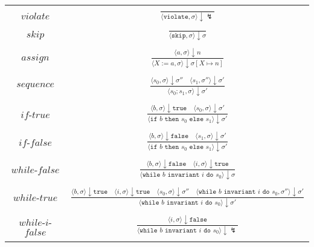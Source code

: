 \begin{tabular}{|c c|}
 \hline
  & \\
 $violate$ & $
		\frac{}{\langle \texttt{violate}, \sigma \rangle \downarrow \lightning}$ \\
  & \\
 $skip$ & $
		\frac{}{\langle \texttt{skip}, \sigma \rangle \downarrow \sigma}$ \\
  & \\
 $assign$ & $\frac{
		\langle a, \sigma \rangle \downarrow n
	}{
		\langle X:= a, \sigma \rangle \downarrow \sigma [X \mapsto n]
	} $\\
  & \\
 $sequence$ & $\frac{
		\langle s_0, \sigma \rangle \downarrow \sigma '' \quad
    \langle s_1, \sigma '' \rangle \downarrow \sigma'
	}{
		\langle s_0;s_1, \sigma \rangle \downarrow \sigma '
	} $\\
  & \\
 $if$-$true$ & $\frac{
		\langle b, \sigma \rangle \downarrow \texttt{true} \quad
    \langle s_0, \sigma \rangle \downarrow \sigma'
	}{
		\langle \texttt{if } b \texttt{ then } s_0 \texttt{ else } s_1 \rangle \downarrow \sigma '
	} $\\
  & \\
 $if$-$false$ & $\frac{
		\langle b, \sigma \rangle \downarrow \texttt{false} \quad
    \langle s_1, \sigma \rangle \downarrow \sigma'
	}{
		\langle \texttt{if } b \texttt{ then } s_0 \texttt{ else } s_1 \rangle \downarrow \sigma '
	} $\\
  & \\
 $while$-$false$ & $\frac{
		\langle b, \sigma \rangle \downarrow \texttt{false} \quad
    \langle i, \sigma \rangle \downarrow \texttt{true}
	}{
		\langle \texttt{while } b \texttt{ invariant } i \texttt{ do } s_0 \rangle \downarrow \sigma
	} $\\
  & \\
 $while$-$true$ & $\frac{
		\langle b, \sigma \rangle \downarrow \texttt{true} \quad
		\langle i, \sigma \rangle \downarrow \texttt{true} \quad
		\langle s_0, \sigma \rangle \downarrow \sigma '' \quad
		\langle \texttt{while } b \texttt{ invariant } i \texttt{ do } s_0, \sigma'' \rangle \downarrow \sigma'
	}{
		\langle \texttt{while } b \texttt{ invariant } i \texttt{ do } s_0 \rangle \downarrow \sigma'
	}$ \\
  & \\
 $while$-$i$-$false$ & $\frac{
		\langle i, \sigma \rangle \downarrow \texttt{false}
	}{
		\langle \texttt{while } b \texttt{ invariant } i \texttt{ do } s_0 \rangle \downarrow \lightning
	}$ \\
  & \\
 \hline
\end{tabular}
